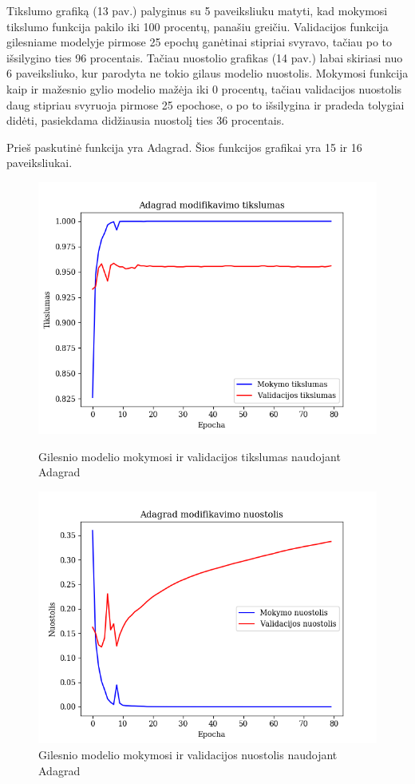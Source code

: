 \documentclass{VUMIFPSkursinis}
\begin{document}
Tikslumo grafiką (13 pav.) palyginus su 5 paveiksliuku matyti, kad mokymosi tikslumo funkcija pakilo iki 100 procentų, panašiu greičiu. Validacijos funkcija gilesniame modelyje pirmose 25 epochų ganėtinai 
stipriai svyravo, tačiau po to išsilygino ties 96 procentais. 
Tačiau nuostolio grafikas (14 pav.) labai skiriasi nuo 6 paveiksliuko, kur parodyta ne tokio gilaus modelio nuostolis. Mokymosi funkcija kaip ir mažesnio gylio modelio mažėja iki 0 procentų, tačiau validacijos nuostolis 
daug stipriau svyruoja pirmose 25 epochose, o po to išsilygina ir pradeda tolygiai didėti, pasiekdama didžiausia nuostolį ties 36 procentais.

Prieš paskutinė funkcija yra Adagrad. Šios funkcijos grafikai yra 15 ir 16 paveiksliukai.

\begin{figure}[!htbp]
  \centering
  \begin{minipage}[b]{0.49\textwidth}
    \includegraphics[width=\textwidth]{img/AL/Adagrad_acc.png}
    \caption{Gilesnio modelio mokymosi ir validacijos tikslumas naudojant Adagrad}
  \end{minipage}
  \begin{minipage}[b]{0.49\textwidth}
    \includegraphics[width=\textwidth]{img/AL/Adagrad_loss.png}
    \caption{Gilesnio modelio mokymosi ir validacijos nuostolis naudojant Adagrad}
  \end{minipage}
\end{figure}
\end{document}
